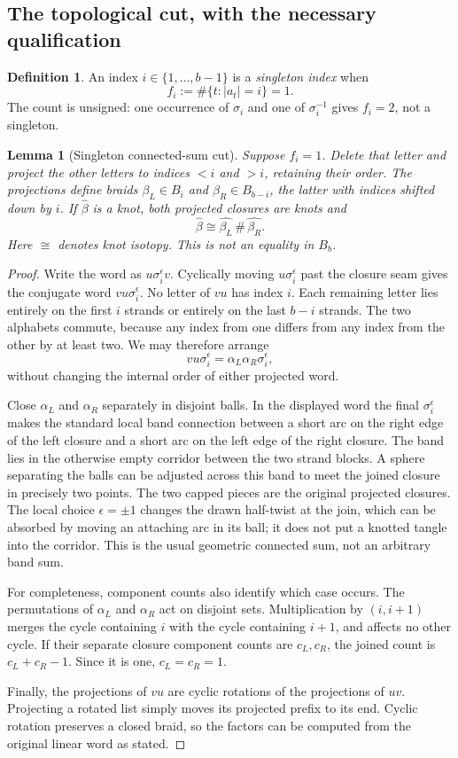 \documentclass[11pt,letterpaper]{article}
\newtheorem{lemma}[theorem]{Lemma}
\theoremstyle{definition}
\newtheorem{definition}[theorem]{Definition}
\newcommand{\cl}[1]{\widehat{#1}}
\begin{document}
\subsection{The topological cut, with the necessary qualification}
\begin{definition}
An index $i\in\{1,\ldots,b-1\}$ is a \emph{singleton index} when
\[
 f_i:=\#\{t:|a_t|=i\}=1.
\]
The count is unsigned: one occurrence of $\sigma_i$ and one of $\sigma_i^{-1}$ gives $f_i=2$, not a singleton.
\end{definition}

\begin{lemma}[Singleton connected-sum cut]
\label{lem:split}
Suppose $f_i=1$. Delete that letter and project the other letters to indices $<i$ and $>i$, retaining their order. The projections define braids $\beta_L\in B_i$ and $\beta_R\in B_{b-i}$, the latter with indices shifted down by $i$. If $\cl\beta$ is a knot, both projected closures are knots and
\[
 \cl\beta\cong\cl{\beta_L}\,\#\,\cl{\beta_R}.
\]
Here $\cong$ denotes knot isotopy. This is not an equality in $B_b$.
\end{lemma}
\begin{proof}
Write the word as $u\sigma_i^\epsilon v$. Cyclically moving $u\sigma_i^\epsilon$ past the closure seam gives the conjugate word $vu\sigma_i^\epsilon$. No letter of $vu$ has index $i$. Each remaining letter lies entirely on the first $i$ strands or entirely on the last $b-i$ strands. The two alphabets commute, because any index from one differs from any index from the other by at least two. We may therefore arrange
\[
 vu\sigma_i^\epsilon=\alpha_L\alpha_R\sigma_i^\epsilon,
\]
without changing the internal order of either projected word.

Close $\alpha_L$ and $\alpha_R$ separately in disjoint balls. In the displayed word the final $\sigma_i^\epsilon$ makes the standard local band connection between a short arc on the right edge of the left closure and a short arc on the left edge of the right closure. The band lies in the otherwise empty corridor between the two strand blocks. A sphere separating the balls can be adjusted across this band to meet the joined closure in precisely two points. The two capped pieces are the original projected closures. The local choice $\epsilon=\pm1$ changes the drawn half-twist at the join, which can be absorbed by moving an attaching arc in its ball; it does not put a knotted tangle into the corridor. This is the usual geometric connected sum, not an arbitrary band sum.

For completeness, component counts also identify which case occurs. The permutations of $\alpha_L$ and $\alpha_R$ act on disjoint sets. Multiplication by $(i,i+1)$ merges the cycle containing $i$ with the cycle containing $i+1$, and affects no other cycle. If their separate closure component counts are $c_L,c_R$, the joined count is $c_L+c_R-1$. Since it is one, $c_L=c_R=1$.

Finally, the projections of $vu$ are cyclic rotations of the projections of $uv$. Projecting a rotated list simply moves its projected prefix to its end. Cyclic rotation preserves a closed braid, so the factors can be computed from the original linear word as stated.
\end{proof}
\end{document}
